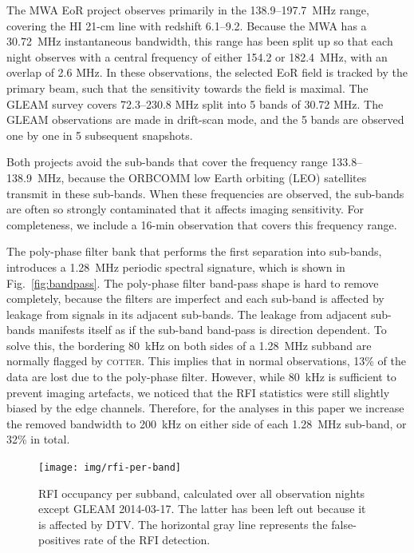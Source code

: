 \documentclass{pasa}
\begin{document}
The MWA EoR project observes primarily in the 138.9--197.7~MHz range, covering the HI 21-cm line with redshift 6.1--9.2. Because the MWA has a 30.72~MHz instantaneous bandwidth, this range has been split up so that each night observes with a central frequency of either 154.2 or 182.4~MHz, with an overlap of 2.6 MHz. In these observations, the selected EoR field is tracked by the primary beam, such that the sensitivity towards the field is maximal. The GLEAM survey covers 72.3--230.8 MHz split into 5 bands of 30.72 MHz. The GLEAM observations are made in drift-scan mode, and the 5 bands are observed one by one in 5 subsequent snapshots.

Both projects avoid the sub-bands that cover the frequency range 133.8--138.9~MHz, because the ORBCOMM low Earth orbiting (LEO) satellites transmit in these sub-bands. When these frequencies are observed, the sub-bands are often so strongly contaminated that it affects imaging sensitivity. For completeness, we include a 16-min observation that covers this frequency range.

The poly-phase filter bank that performs the first separation into sub-bands, introduces a 1.28~MHz periodic spectral signature, which is shown in Fig.~\ref{fig:bandpass}. The poly-phase filter band-pass shape is hard to remove completely, because the filters are imperfect and each sub-band is affected by leakage from signals in its adjacent sub-bands. The leakage from adjacent sub-bands manifests itself as if the sub-band band-pass is direction dependent. To solve this, the bordering 80~kHz on both sides of a 1.28~MHz subband are normally flagged by \textsc{cotter}. This implies that in normal observations, 13\% of the data are lost due to the poly-phase filter. However, while 80~kHz is sufficient to prevent imaging artefacts, we noticed that the RFI statistics were still slightly biased by the edge channels. Therefore, for the analyses in this paper we increase the removed bandwidth to 200~kHz on either side of each 1.28~MHz sub-band, or 32\% in total.
\noindent\begin{figure}
\begin{center}\hspace*{-0.2cm}\texttt{[image: img/rfi-per-band]}
\caption{RFI occupancy per subband, calculated over all observation nights except GLEAM 2014-03-17. The latter has been left out because it is affected by DTV. The horizontal gray line represents the false-positives rate of the RFI detection.}
\label{fig:rfi-per-band}
\end{center}
\end{figure}
\end{document}
